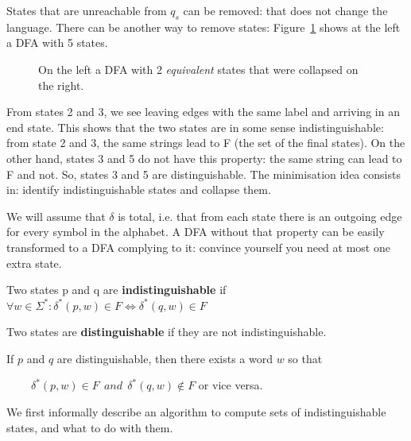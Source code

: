 States that are unreachable from $q_s$ can be removed: that does not
change the language. There can be another way to remove states:
Figure~\ref{mini1} shows at the left a DFA with 5 states.

\begin{figure}[h]
\caption{ On the left a DFA with 2 {\em equivalent} states that were
collapsed on the right.\label{mini1}}
\end{figure}

From states 2 and 3, we see leaving edges with the same label and
arriving in an end state. This shows that the two states are in some
sense indistinguishable: from state 2 and 3, the same strings lead to
F (the set of the final states). On the other hand, states 3 and 5 do not have this property: the
same string can lead to F and not. So, states 3 and 5 are
distinguishable. The minimisation idea consists in: identify
indistinguishable states and collapse them.

We will assume that $\delta$ is total, i.e. that from each state there
is an outgoing edge for every symbol in the alphabet. A DFA without
that property can be easily transformed to a DFA complying to it:
convince yourself you need at most one extra state.

\begin{definition} \label{gelijk}
Two states p and q are {\bf indistinguishable} if
$\forall w \in \Sigma^*: \delta^*(p,w) \in F \Longleftrightarrow \delta^*(q,w) \in F$

Two states are {\bf distinguishable} if they are not indistinguishable.
\end{definition}

If $p$ and $q$ are distinguishable, then there exists a word $w$ so that

$~~~~~~~~~~\delta^*(p,w) \in F~~and~~ \delta^*(q,w) \notin F$ or vice versa.


We first informally describe an algorithm to compute sets of
indistinguishable states, and what to do with them.

